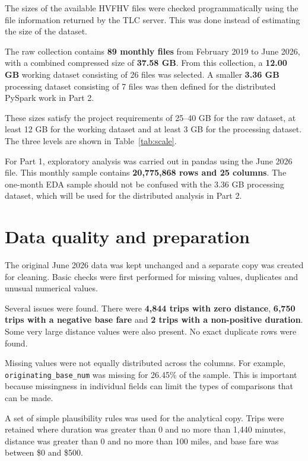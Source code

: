 \documentclass[10pt,twocolumn]{article}
\begin{document}
The sizes of the available HVFHV files were checked programmatically
using the file information returned by the TLC server. This was done
instead of estimating the size of the dataset.

The raw collection contains \textbf{89 monthly files} from
February 2019 to June 2026, with a combined compressed size of
\textbf{37.58 GB}. From this collection, a \textbf{12.00 GB}
working dataset consisting of 26 files was selected. A smaller
\textbf{3.36 GB} processing dataset consisting of 7 files was then
defined for the distributed PySpark work in Part 2.

These sizes satisfy the project requirements of 25--40 GB for the
raw dataset, at least 12 GB for the working dataset and at least
3 GB for the processing dataset. The three levels are shown in
Table~\ref{tab:scale}.

For Part 1, exploratory analysis was carried out in pandas using the
June 2026 file. This monthly sample contains
\textbf{20,775,868 rows and 25 columns}. The one-month EDA sample
should not be confused with the 3.36 GB processing dataset, which
will be used for the distributed analysis in Part 2.

\section{Data quality and preparation}

The original June 2026 data was kept unchanged and a separate copy
was created for cleaning. Basic checks were first performed for
missing values, duplicates and unusual numerical values.

Several issues were found. There were \textbf{4,844 trips with zero
distance}, \textbf{6,750 trips with a negative base fare} and
\textbf{2 trips with a non-positive duration}. Some very large
distance values were also present. No exact duplicate rows were
found.

Missing values were not equally distributed across the columns. For
example, \texttt{originating\_base\_num} was missing for 26.45\% of
the sample. This is important because missingness in individual
fields can limit the types of comparisons that can be made.

A set of simple plausibility rules was used for the analytical copy.
Trips were retained where duration was greater than 0 and no more
than 1,440 minutes, distance was greater than 0 and no more than
100 miles, and base fare was between \$0 and \$500.
\end{document}
